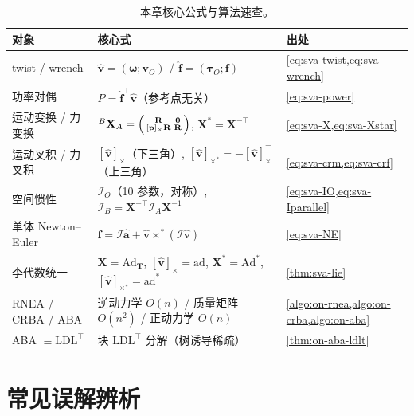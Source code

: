 \begin{table}[H]\centering\small
\caption{本章核心公式与算法速查。}
\label{tab:sva-summary}
\begin{tabular}{lll}
\toprule
对象 & 核心式 & 出处 \\
\midrule
twist / wrench & $\hat{\mathbf v}=(\boldsymbol\omega;\mathbf v_O)$ / $\hat{\mathbf f}=(\boldsymbol\tau_O;\mathbf f)$ & \cref{eq:sva-twist,eq:sva-wrench} \\
功率对偶 & $P=\hat{\mathbf f}^\top\hat{\mathbf v}$（参考点无关） & \cref{eq:sva-power} \\
运动变换 / 力变换 & ${}^B\mathbf X_A=\begin{psmallmatrix}\mathbf R&\mathbf 0\\ [\mathbf p]_\times\mathbf R&\mathbf R\end{psmallmatrix}$, $\mathbf X^*=\mathbf X^{-\top}$ & \cref{eq:sva-X,eq:sva-Xstar} \\
运动叉积 / 力叉积 & $[\hat{\mathbf v}]_\times$（下三角）, $[\hat{\mathbf v}]_{\times^*}=-[\hat{\mathbf v}]_\times^\top$（上三角） & \cref{eq:sva-crm,eq:sva-crf} \\
空间惯性 & $\mathcal I_O$（10 参数，对称）, $\mathcal I_B=\mathbf X^{-\top}\mathcal I_A\mathbf X^{-1}$ & \cref{eq:sva-IO,eq:sva-Iparallel} \\
单体 Newton--Euler & $\hat{\mathbf f}=\mathcal I\hat{\mathbf a}+\hat{\mathbf v}\times^*(\mathcal I\hat{\mathbf v})$ & \cref{eq:sva-NE} \\
李代数统一 & $\mathbf X=\mathrm{Ad}_{\mathbf T}$, $[\hat{\mathbf v}]_\times=\mathrm{ad}$, $\mathbf X^*=\mathrm{Ad}^*$, $[\hat{\mathbf v}]_{\times^*}=\mathrm{ad}^*$ & \cref{thm:sva-lie} \\
RNEA / CRBA / ABA & 逆动力学 $O(n)$ / 质量矩阵 $O(n^2)$ / 正动力学 $O(n)$ & \cref{algo:on-rnea,algo:on-crba,algo:on-aba} \\
ABA $\equiv\mathrm{LDL}^\top$ & 块 $\mathrm{LDL}^\top$ 分解（树诱导稀疏） & \cref{thm:on-aba-ldlt} \\
\bottomrule
\end{tabular}
\end{table}

\section*{常见误解辨析}

